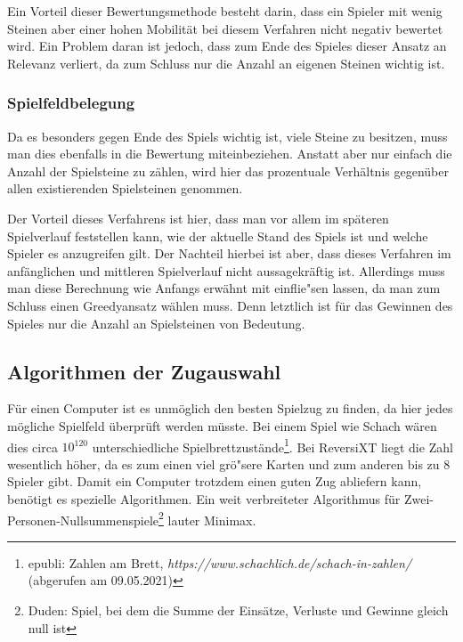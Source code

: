 Ein Vorteil dieser Bewertungsmethode besteht darin, dass ein Spieler mit wenig Steinen aber einer hohen Mobilit\"at bei diesem Verfahren nicht negativ bewertet wird.
Ein Problem daran ist jedoch, dass zum Ende des Spieles dieser Ansatz an Relevanz verliert, da zum Schluss nur die Anzahl an eigenen Steinen wichtig ist.

\subsubsection{Spielfeldbelegung}\label{subsubsec:spielfeldbelegung}
Da es besonders gegen Ende des Spiels wichtig ist, viele Steine zu besitzen, muss man dies ebenfalls in die Bewertung miteinbeziehen.
Anstatt aber nur einfach die Anzahl der Spielsteine zu z\"ahlen, wird hier das prozentuale Verh\"altnis gegen\"uber allen existierenden Spielsteinen genommen.

Der Vorteil dieses Verfahrens ist hier, dass man vor allem im sp\"ateren Spielverlauf feststellen kann, wie der aktuelle Stand des Spiels ist und welche Spieler es anzugreifen gilt.
Der Nachteil hierbei ist aber, dass dieses Verfahren im anf\"anglichen und mittleren Spielverlauf nicht aussagekr\"aftig ist.
Allerdings muss man diese Berechnung wie Anfangs erw\"ahnt mit einflie"sen lassen, da man zum Schluss einen Greedyansatz w\"ahlen muss.
Denn letztlich ist f\"ur das Gewinnen des Spieles nur die Anzahl an Spielsteinen von Bedeutung.


\subsection{Algorithmen der Zugauswahl}\label{subsec:algorithmen-der-zugauswahl}
F\"ur einen Computer ist es unm\"oglich den besten Spielzug zu finden, da hier jedes m\"ogliche Spielfeld \"uberpr\"uft werden m\"usste.
Bei einem Spiel wie Schach w\"aren dies circa $10^{120}$ unterschiedliche Spielbrettzust\"ande\footnote{epubli: Zahlen am Brett, \textit{https://www.schachlich.de/schach-in-zahlen/} (abgerufen am 09.05.2021)}.
Bei ReversiXT liegt die Zahl wesentlich h\"oher, da es zum einen viel gr\"o"sere Karten und zum anderen bis zu 8 Spieler gibt.
Damit ein Computer trotzdem einen guten Zug abliefern kann, ben\"otigt es spezielle Algorithmen.
Ein weit verbreiteter Algorithmus f\"ur Zwei-Personen-Nullsummenspiele\footnote{Duden: Spiel, bei dem die Summe der Einsätze, Verluste und Gewinne gleich null ist} lauter Minimax.

